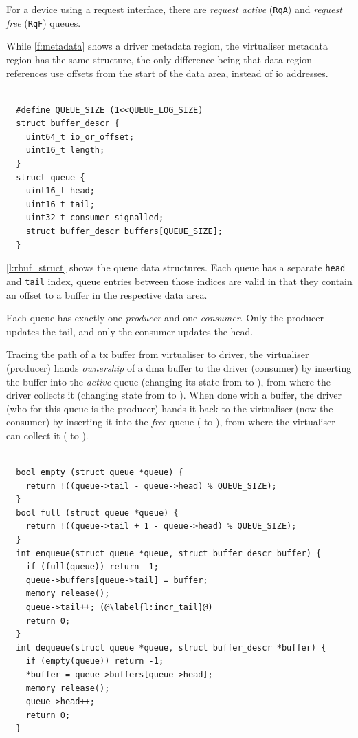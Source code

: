 \documentclass[a4paper,12pt]{report}
\newcommand*\circled[1]{\tikz[baseline=(char.base)]{
            \node[shape=circle,draw,inner sep=0pt,thick] (char) {#1};}}
\newcommand{\code}[1]{\texttt{#1}}
\begin{document}
For a device using a request interface, there are
\emph{request active} (\code{RqA}) and \emph{request free}
(\code{RqF}) queues.

While \autoref{f:metadata} shows a driver metadata region, the virtualiser
metadata region has the same structure, the only difference being that
data region references use offsets from the start of the data area,
instead of \gls{io} addresses.

\begin{lstlisting}[gobble=2,firstline=2,float=th,tabsize=2,
  label={l:rbuf_struct},
  caption={Control region queue data structures.}]

  #define QUEUE_SIZE (1<<QUEUE_LOG_SIZE)
  struct buffer_descr {
    uint64_t io_or_offset;
    uint16_t length;
  }
  struct queue {
    uint16_t head;
    uint16_t tail;
    uint32_t consumer_signalled;
    struct buffer_descr buffers[QUEUE_SIZE];
  }
\end{lstlisting}

\autoref{l:rbuf_struct} shows the queue data structures.
Each queue has a separate \code{head} and \code{tail} index,
queue entries between those indices are valid in that they
contain an offset to a buffer in the respective data area.

Each queue has exactly one \emph{producer} and one
\emph{consumer}. Only the producer updates the tail, and
only the consumer updates the head.

Tracing the path of a \gls{tx} buffer from virtualiser to driver, the virtualiser (producer) hands
\emph{ownership} of a \gls{dma} buffer to the driver (consumer) by inserting the buffer into the \emph{active}
queue (changing its state from \circled{\ref{st:so_u}} to \circled{\ref{st:do_i}}), from where
the driver collects it (changing state from \circled{\ref{st:do_i}} to \circled{\ref{st:do_u}}). When done with a buffer,
the driver (who for this queue is the producer) hands it back to the virtualiser (now the consumer) by inserting it into the
\emph{free} queue (\circled{\ref{st:do_u}} to \circled{\ref{st:so_i}}), from where the virtualiser
can collect it (\circled{\ref{st:so_i}} to \circled{\ref{st:so_u}}).

\begin{lstlisting}[gobble=2,firstline=2,float=th,tabsize=2,
  label={l:rbuf_use},
  caption={Control-region queue management. }]

  bool empty (struct queue *queue) {
    return !((queue->tail - queue->head) % QUEUE_SIZE);
  }
  bool full (struct queue *queue) {
    return !((queue->tail + 1 - queue->head) % QUEUE_SIZE);
  }
  int enqueue(struct queue *queue, struct buffer_descr buffer) {
    if (full(queue)) return -1;
    queue->buffers[queue->tail] = buffer;
    memory_release();
    queue->tail++; (@\label{l:incr_tail}@)
    return 0;
  }
  int dequeue(struct queue *queue, struct buffer_descr *buffer) {
    if (empty(queue)) return -1;
    *buffer = queue->buffers[queue->head];
    memory_release();
    queue->head++;
    return 0;
  }
\end{lstlisting}
\end{document}
